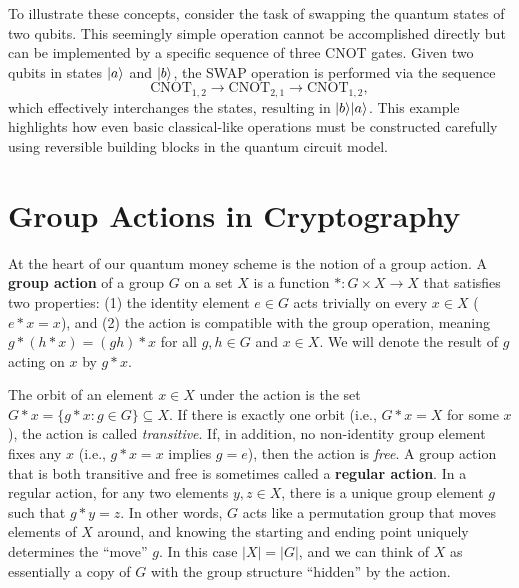 \documentclass[12pt]{report}
\begin{document}
To illustrate these concepts, consider the task of swapping the quantum states of two qubits. This seemingly simple operation cannot be accomplished directly but can be implemented by a specific sequence of three CNOT gates. Given two qubits in states $\lvert a\rangle$ and $\lvert b\rangle$, the SWAP operation is performed via the sequence
\[
\text{CNOT}_{1,2} \rightarrow \text{CNOT}_{2,1} \rightarrow \text{CNOT}_{1,2},
\]
which effectively interchanges the states, resulting in $\lvert b\rangle \lvert a\rangle$. This example highlights how even basic classical-like operations must be constructed carefully using reversible building blocks in the quantum circuit model.




\section{Group Actions in Cryptography}
At the heart of our quantum money scheme is the notion of a group action. A \textbf{group action} of a group $G$ on a set $X$ is a function $*\colon G \times X \to X$ that satisfies two properties: (1) the identity element $e \in G$ acts trivially on every $x \in X$ ($e * x = x$), and (2) the action is compatible with the group operation, meaning $g*(h* x) = (gh)*x$ for all $g,h \in G$ and $x \in X$. We will denote the result of $g$ acting on $x$ by $g*x$.

The orbit of an element $x \in X$ under the action is the set $G * x = \{g*x : g \in G\} \subseteq X$. If there is exactly one orbit (i.e., $G * x = X$ for some $x$), the action is called \emph{transitive}. If, in addition, no non-identity group element fixes any $x$ (i.e., $g * x = x$ implies $g = e$), then the action is \emph{free}. A group action that is both transitive and free is sometimes called a \textbf{regular action}. In a regular action, for any two elements $y, z \in X$, there is a unique group element $g$ such that $g * y = z$. In other words, $G$ acts like a permutation group that moves elements of $X$ around, and knowing the starting and ending point uniquely determines the “move” $g$. In this case $|X| = |G|$, and we can think of $X$ as essentially a copy of $G$ with the group structure “hidden” by the action.
\end{document}
